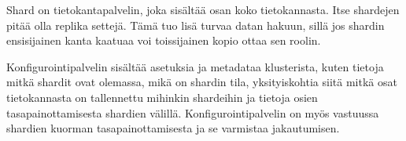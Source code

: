 Shard on tietokantapalvelin, joka sisältää osan koko tietokannasta.
Itse shardejen pitää olla replika settejä.
Tämä tuo lisä turvaa datan hakuun, sillä jos shardin ensisijainen kanta kaatuaa voi toissijainen kopio ottaa sen roolin. 
\medskip



Konfigurointipalvelin sisältää asetuksia ja metadataa klusterista,
kuten tietoja mitkä shardit ovat olemassa, mikä on shardin tila,
yksityiskohtia siitä mitkä osat tietokannasta on tallennettu mihinkin shardeihin
ja tietoja osien tasapainottamisesta shardien välillä.
Konfigurointipalvelin on myös vastuussa shardien kuorman tasapainottamisesta ja se varmistaa jakautumisen.








